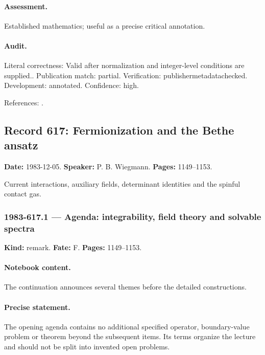\paragraph{Assessment.} Established mathematics; useful as a precise critical annotation.

\paragraph{Audit.} Literal correctness: Valid after normalization and integer-level conditions are supplied.. Publication match: partial. Verification: publishermetadatachecked. Development: annotated. Confidence: high.

\noindent References: \citep{polyakovwiegmann1984multivalued}.\par

\subsection{Record 617: Fermionization and the Bethe ansatz}

\label{talk:617}

\noindent\textbf{Date:} 1983-12-05. \textbf{Speaker:} P. B. Wiegmann. \textbf{Pages:} 1149--1153.\par

Current interactions, auxiliary fields, determinant identities and the spinful contact gas.

\subsubsection{1983-617.1 --- Agenda: integrability, field theory and solvable spectra}

\label{item:1983-617.1}

\noindent\textbf{Kind:} remark. \textbf{Fate:} F. \textbf{Pages:} 1149--1153.\par

\paragraph{Notebook content.} The continuation announces several themes before the detailed constructions.

\paragraph{Precise statement.} The opening agenda contains no additional specified operator, boundary-value problem or theorem beyond the subsequent items. Its terms organize the lecture and should not be split into invented open problems.

